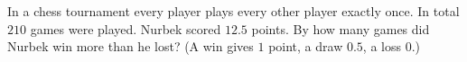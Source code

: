 In a chess tournament every player plays every other player exactly once. In total $210$ games were played. Nurbek scored $12.5$ points. By how many games did Nurbek win more than he lost? (A win gives $1$ point, a draw $0.5$, a loss $0$.)
